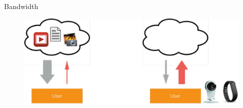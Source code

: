 \begin{frame}{Bandwidth}
  \begin{figure}
    \includegraphics[width=\textwidth]{figures/upstream-downstream.pdf}
  \end{figure}
\end{frame}

